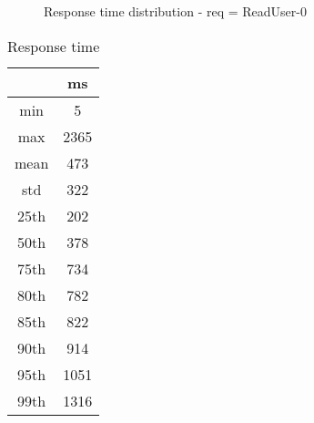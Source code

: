 \begin{minipage}{0.75\linewidth}
\begin{figure}[h]
\begin{adjustbox}{max width=1.0\linewidth, keepaspectratio}
  \end{adjustbox}
  \caption{Response time distribution - req = ReadUser-0}
\end{figure}
\end{minipage}\hfill\begin{minipage}{0.18\linewidth}
\begin{table}[h]
\begin{tabular}{|cc|}
\hline
\textbf{} & \textbf{ms}\\ \hline
 \Xhline{0.005\arrayrulewidth}
min & 5\\
 \Xhline{0.005\arrayrulewidth}
max & 2365\\
 \Xhline{0.005\arrayrulewidth}
mean & 473\\
 \Xhline{0.005\arrayrulewidth}
std & 322\\
\hline
\hline
 \Xhline{0.005\arrayrulewidth}
25th & 202\\
 \Xhline{0.005\arrayrulewidth}
50th & 378\\
 \Xhline{0.005\arrayrulewidth}
75th & 734\\
 \Xhline{0.005\arrayrulewidth}
80th & 782\\
 \Xhline{0.005\arrayrulewidth}
85th & 822\\
 \Xhline{0.005\arrayrulewidth}
90th & 914\\
 \Xhline{0.005\arrayrulewidth}
95th & 1051\\
 \Xhline{0.005\arrayrulewidth}
99th & 1316\\
\hline
\end{tabular}
\caption{Response time}
\end{table}
\end{minipage}\hfill